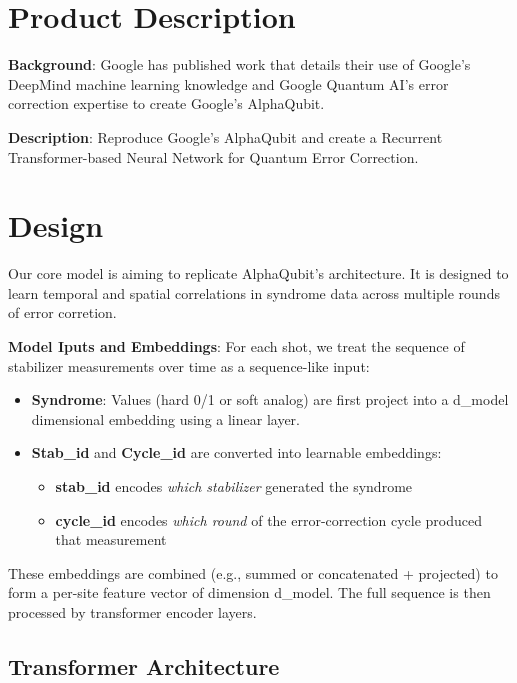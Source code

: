 \documentclass[12pt]{article}
\begin{document}
\maketitlepage

\section{Product Description}

\textbf{Background}: Google has published work that details their use of Google's DeepMind machine learning knowledge and Google Quantum AI's error correction expertise to create Google's AlphaQubit.

\textbf{Description}: Reproduce Google's AlphaQubit and create a Recurrent Transformer-based Neural Network for Quantum Error Correction. 

\section{Design}

Our core model is aiming to replicate AlphaQubit's architecture. It is designed to learn temporal and spatial correlations in syndrome data across multiple rounds of error corretion.

\textbf{Model Iputs and Embeddings}: For each shot, we treat the sequence of stabilizer measurements over time as a sequence-like input:

\begin{itemize}
    \item \textbf{Syndrome}: Values (hard 0/1 or soft analog) are first project into a d\_model dimensional embedding using a linear layer.
    \item \textbf{Stab\_id} and \textbf{Cycle\_id} are converted into learnable embeddings:
    \begin{itemize}
        \item \textbf{stab\_id} encodes \textit{which stabilizer} generated the syndrome
        \item \textbf{cycle\_id} encodes \textit{which round} of the error-correction cycle produced that measurement
    \end{itemize}
\end{itemize}

These embeddings are combined (e.g., summed or concatenated + projected) to form a per-site feature vector of dimension d\_model. The full sequence is then processed by transformer encoder layers.

\subsection*{Transformer Architecture}
\end{document}
